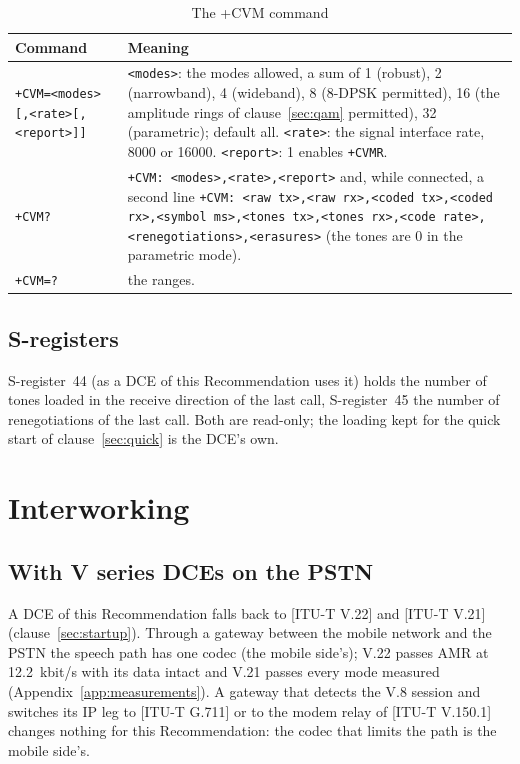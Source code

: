 \documentclass[a4paper,11pt]{article}
\newcommand{\rec}[1]{[ITU-T #1]}
\newcommand{\kbs}{kbit/s}
\newcommand{\thd}[1]{\textbf{#1}}
\newcommand{\code}[1]{\texttt{#1}}
\begin{document}
\begin{table}[htbp]
\caption{The +CVM command}
\label{tab:atcvm}
\small
\begin{tabularx}{\textwidth}{>{\raggedright\arraybackslash}p{6.0cm}X}
\toprule
\rowcolor{ituhead}\thd{Command} & \thd{Meaning} \\
\midrule
\code{+CVM=<modes>}\allowbreak\code{[,<rate>}\allowbreak\code{[,<report>]]} & \code{<modes>}: the modes allowed, a sum of 1 (robust), 2 (narrowband), 4 (wideband), 8 (8-DPSK permitted), 16 (the amplitude rings of clause~\ref{sec:qam} permitted), 32 (parametric); default all.  \code{<rate>}: the signal interface rate, 8000 or 16000.  \code{<report>}: 1 enables \code{+CVMR}. \\
\code{+CVM?} & \code{+CVM: <modes>,<rate>,<report>} and, while connected, a second line \code{+CVM: <raw tx>,<raw rx>,<coded tx>,<coded rx>,<symbol ms>,<tones tx>,<tones rx>,<code rate>,<renegotiations>,<erasures>} (the tones are 0 in the parametric mode). \\
\code{+CVM=?} & the ranges. \\
\bottomrule
\end{tabularx}
\end{table}

\subsection{S-registers}
S-register~44 (as a DCE of this Recommendation uses it) holds the number
of tones loaded in the receive direction of the last call, S-register~45
the number of renegotiations of the last call.  Both are read-only; the
loading kept for the quick start of clause~\ref{sec:quick} is the DCE's
own.

\section{Interworking}\label{sec:interworking}
\subsection{With V series DCEs on the PSTN}
A DCE of this Recommendation falls back to \rec{V.22} and \rec{V.21}
(clause~\ref{sec:startup}).  Through a gateway between the mobile network
and the PSTN the speech path has one codec (the mobile side's); V.22
passes AMR at 12.2~\kbs{} with its data intact and V.21 passes every
mode measured (Appendix~\ref{app:measurements}).  A gateway that detects
the V.8 session and switches its IP leg to \rec{G.711} or to the modem
relay of \rec{V.150.1} changes nothing for this Recommendation: the codec
that limits the path is the mobile side's.
\end{document}
